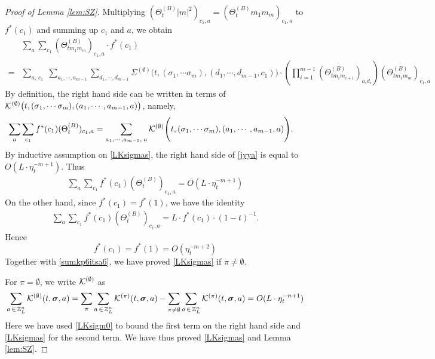 \documentclass[10pt,reqno]{article}
\theoremstyle{plain} %
\theoremstyle{remark}
\numberwithin{equation}{section}
\begin{document}
\begin{proof}[ Proof of Lemma  \ref{lem:SZ}]
Multiplying  $(\Theta^{(B) }_t|m|^2)_{c_1,a}=(\Theta^{(B) }_tm_1m_m)_{c_1,a}$ to   $f^*(c_1)$ and summing up $c_1$ and $a$,  we obtain 
\begin{align}\label{sumkp7itsa7}
   & \sum_{a}\sum_{c_1}(\Theta^{(B) }_{tm_1m_m})_{c_1 ,a}\cdot f^*(c_1)
    \\\nonumber
     =& \sum_{a,\,c_1}\;\sum_{a_1,\cdots, a_{m-1}}\sum_{d_1,\cdots, d_{m-1}}\Sigma^{(\emptyset)}\Bigg(t, (\sigma_1, \cdots \sigma_m), (d_1,\cdots, d_{m-1}, c_1)\Bigg)\cdot  \left(\prod_{i=1}^{m-1}\left(\Theta^{(B)}_{tm_im_{i+1}}\right)_{a_id_i}\right)(\Theta^{(B) }_{tm_1m_m})_{c_1 ,a} 
\end{align}
By definition, the right hand side  can be written in terms of  ${\cal K}^{(\emptyset)} \big(t, (\sigma_1, \cdots \sigma_m), (a_1,\cdots, a_{m-1}, a)\big)$, namely, 
\begin{align}\label{jyya}
 \sum_a\sum_{c_1}f^*(c_1)(\Theta^{(B) }_t)_{c_1,a}&=\sum_{a_1,\cdots, a_{m-1},\;a}{\cal K}^{(\emptyset)} \Bigg(t, (\sigma_1, \cdots \sigma_m), (a_1,\cdots, a_{m-1}, a)\Bigg) .
\end{align}
By  inductive assumption on \eqref{LKsigmas},  the right hand side  of \eqref{jyya} is equal to $O(L\cdot\eta_t^{-m+1})$. Thus 
\begin{align}\label{jyasdfya}
\sum_a\sum_{c_1}f^*(c_1)(\Theta^{(B) }_t)_{c_1,a} = O(L\cdot\eta_t^{-m+1})
\end{align}
On the other hand, since $f^*(c_1)=f^*(1)$, we have the identity 
\begin{align}
\sum_a\sum_{c_1}f^*(c_1)(\Theta^{(B) }_t)_{c_1,a}=L\cdot f^*(c_1)\cdot (1-t)^{-1}.
\end{align}
Hence
 $$
  f^*(c_1)=f^*(1)=O(\eta_t^{-m+2}) $$
Together with \eqref{sumkp6itsa6}, we have proved   \eqref{LKsigmas}  if  $\pi\ne \emptyset$.  


For  $\pi=\emptyset$, we write ${\cal K}^{(\emptyset)}$  as
\begin{align}\label{LKsigmasES}
 \sum_{\textbf{a}\,\in \,\mathbb Z^{n}_L } 
{\cal K}^{(\emptyset)}(t, \boldsymbol{\sigma}, \textbf{a})
=
 \sum_{\pi}\sum_{\textbf{a}\,\in \,\mathbb Z^{n}_L } 
{\cal K}^{(\pi)}(t, \boldsymbol{\sigma}, \textbf{a})
-
\sum_{\pi\ne\emptyset}  \sum_{\textbf{a}\,\in \,\mathbb Z^{n}_L } 
{\cal K}^{(\pi)}(t, \boldsymbol{\sigma}, \textbf{a}) 
=
  O(L\cdot \eta_{t}^{-n+1}) 
\end{align}
Here  we have used \eqref{LKsigm0} to bound the first term on the right hand side and  \eqref{LKsigmas} for the second term. 
We  have thus proved  \eqref{LKsigmas} and Lemma \ref{lem:SZ}. 
 
\end{proof} 
\end{document}
